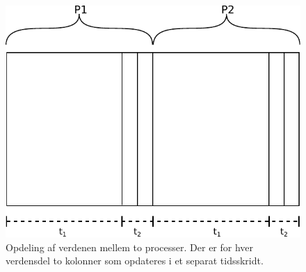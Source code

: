 \begin{figure}
 \begin{center}
  \includegraphics[scale=0.75]{images/wator}
  \caption{Opdeling af verdenen mellem to processer. Der er for hver verdensdel 
  to kolonner som opdateres i et separat tidsskridt.}
  \label{fig:wator}
  \end{center}
\end{figure}


